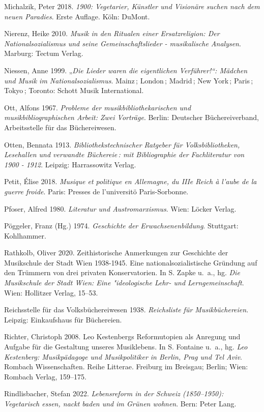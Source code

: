\documentclass[a4paper,
fontsize=11pt,
oneside,
numbers=noperiodatend,
parskip=half-,
bibliography=totoc,
final
]{scrartcl}
\begin{document}
Michalzik, Peter 2018. \emph{1900: Vegetarier, Künstler und Visionäre
suchen nach dem neuen Paradies}. Erste Auflage. Köln: DuMont.

Nierenz, Heike 2010. \emph{Musik in den Ritualen einer Ersatzreligion:
Der Nationalsozialismus und seine Gemeinschaftslieder - musikalische
Analysen}. Marburg: Tectum Verlag.

Niessen, Anne 1999. „\emph{Die Lieder waren die eigentlichen
Verführer!{}``: Mädchen und Musik im Nationalsozialismus}. Mainz\,;
London\,; Madrid\,; New York\,; Paris\,; Tokyo\,; Toronto: Schott Musik
International.

Ott, Alfons 1967. \emph{Probleme der musikbibliothekarischen und
musikbibliographischen Arbeit: Zwei Vorträge}. Berlin: Deutscher
Büchereiverband, Arbeitsstelle für das Büchereiwesen.

Otten, Bennata 1913. \emph{Bibliothekstechnischer Ratgeber für
Volksbibliotheken, Lesehallen und verwandte Büchereie\,: mit
Bibliographie der Fachliteratur von 1900 - 1912}. Leipzig: Harrassowitz
Verlag.

Petit, Élise 2018. \emph{Musique et politique en Allemagne, du IIIe
Reich à l'aube de la guerre froide}. Paris: Presses de l'universitö
Paris-Sorbonne.

Pfoser, Alfred 1980. \emph{Literatur und Austromarxismus}. Wien: Löcker
Verlag.

Pöggeler, Franz (Hg.) 1974. \emph{Geschichte der Erwachsenenbildung}.
Stuttgart: Kohlhammer.

Rathkolb, Oliver 2020. Zeithistorische Anmerkungen zur Geschichte der
Musikschule der Stadt Wien 1938-1945. Eine nationalsozialistische
Gründung auf den Trümmern von drei privaten Konservatorien. In S. Zapke
u.~a., hg. \emph{Die Musikschule der Stadt Wien: Eine "ideologische
Lehr- und Lerngemeinschaft}. Wien: Hollitzer Verlag, 15--53.

Reichsstelle für das Volksbüchereiwesen 1938. \emph{Reichsliste für
Musikbüchereien}. Leipzig: Einkaufshaus für Büchereien.

Richter, Christoph 2008. Leo Kestenbergs Reformutopien als Anregung und
Aufgabe für die Gestaltung unseres Musiklebens. In S. Fontaine u.~a.,
hg. \emph{Leo Kestenberg: Musikpädagoge und Musikpolitiker in Berlin,
Prag und Tel Aviv}. Rombach Wissenschaften. Reihe Litterae. Freiburg im
Breisgau; Berlin; Wien: Rombach Verlag, 159--175.

Rindlisbacher, Stefan 2022. \emph{Lebensreform in der Schweiz
(1850--1950): Vegetarisch essen, nackt baden und im Grünen wohnen}.
Bern: Peter Lang.
\end{document}
